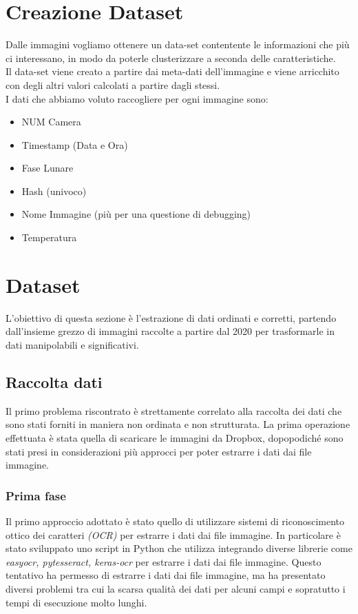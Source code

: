 \documentclass[12pt,a4paper,twoside]{article}
\begin{document}
\section{Creazione Dataset}
Dalle immagini vogliamo ottenere un data-set contentente le informazioni che più ci interessano, in modo da 
poterle clusterizzare a seconda delle caratteristiche.\\
Il data-set viene creato a partire dai meta-dati dell'immagine e viene arricchito con degli altri valori
calcolati a partire dagli stessi.\\
I dati che abbiamo voluto raccogliere per ogni immagine sono:
\begin{itemize}
    \item NUM Camera
    \item Timestamp (Data e Ora)
    \item Fase Lunare
    \item Hash (univoco)
    \item Nome Immagine (più per una questione di debugging)
    \item Temperatura
\end{itemize}

\section{Dataset}
L'obiettivo di questa sezione è l'estrazione di dati ordinati e corretti, partendo dall'insieme grezzo di immagini 
raccolte a partire dal 2020 per trasformarle in dati manipolabili e significativi.

\subsection{Raccolta dati}
Il primo problema riscontrato è strettamente correlato alla raccolta dei dati
che sono stati forniti in maniera non ordinata e non strutturata. La prima operazione effettuata è stata quella di scaricare le immagini da Dropbox, dopopodiché sono stati presi in considerazioni più approcci per poter estrarre i dati dai file immagine.
\subsubsection{Prima fase}
Il primo approccio adottato è stato quello di utilizzare sistemi di riconoscimento ottico dei caratteri \textit{(OCR)} per estrarre i dati dai file immagine. In particolare è stato sviluppato uno script in Python che utilizza integrando diverse librerie come \textit{easyocr, pytesseract, keras-ocr} per estrarre i dati dai file immagine. Questo tentativo ha permesso di estrarre i dati dai file immagine, ma ha presentato diversi problemi tra cui la scarsa qualità dei dati per alcuni campi e sopratutto i tempi di esecuzione molto lunghi. 
\end{document}

